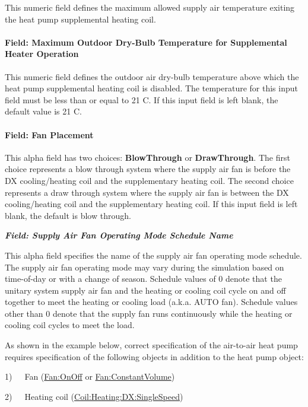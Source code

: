 This numeric field defines the maximum allowed supply air temperature exiting the heat pump supplemental heating coil.

\paragraph{Field: Maximum Outdoor Dry-Bulb Temperature for Supplemental Heater Operation}\label{field-maximum-outdoor-dry-bulb-temperature-for-supplemental-heater-operation-1}

This numeric field defines the outdoor air dry-bulb temperature above which the heat pump supplemental heating coil is disabled. The temperature for this input field must be less than or equal to 21 C. If this input field is left blank, the default value is 21 C.

\paragraph{Field: Fan Placement}\label{field-fan-placement-3}

This alpha field has two choices: \textbf{BlowThrough} or \textbf{DrawThrough}. The first choice represents a blow through system where the supply air fan is before the DX cooling/heating coil and the supplementary heating coil. The second choice represents a draw through system where the supply air fan is between the DX cooling/heating coil and the supplementary heating coil. If this input field is left blank, the default is blow through.

\textbf{\emph{Field: Supply Air Fan Operating Mode Schedule Name}}

This alpha field specifies the name of the supply air fan operating mode schedule. The supply air fan operating mode may vary during the simulation based on time-of-day or with a change of season. Schedule values of 0 denote that the unitary system supply air fan and the heating or cooling coil cycle on and off together to meet the heating or cooling load (a.k.a. AUTO fan). Schedule values other than 0 denote that the supply fan runs continuously while the heating or cooling coil cycles to meet the load.

As shown in the example below, correct specification of the air-to-air heat pump requires specification of the following objects in addition to the heat pump object:

1)~~~Fan (\hyperref[fanonoff]{Fan:OnOff} or \hyperref[fanconstantvolume]{Fan:ConstantVolume})

2)~~~Heating coil (\hyperref[coilheatingdxsinglespeed]{Coil:Heating:DX:SingleSpeed})

